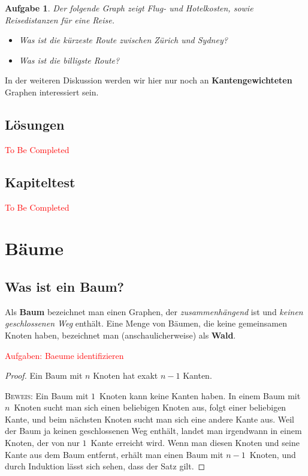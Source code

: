 \documentclass[12pt,a4paper]{report}
\theoremstyle{break}
\newtheorem{exercise}{Aufgabe}[section]
\theoremstyle{plain}
\newtheorem{proof}{Satz}[section]
\begin{document}
\begin{exercise}
\label{travel}
Der folgende Graph zeigt Flug- und Hotelkosten, sowie Reisedistanzen
f\"{u}r eine Reise.


\begin{itemize}
\item Was ist die \emph{k\"{u}rzeste} Route zwischen Z\"{u}rich und
    Sydney?
\item Was ist die \emph{billigste} Route?
\end{itemize}
\end{exercise}

 In der weiteren Diskussion werden wir hier nur noch an \textbf{Kantengewichteten} Graphen interessiert sein.

\section{L\"{o}sungen}

\textcolor{red}{To Be Completed}

\section{Kapiteltest}

\textcolor{red}{To Be Completed}

\chapter{B\"{a}ume}

\section{Was ist ein Baum?}

Als \textbf{Baum} bezeichnet man einen Graphen, der
\emph{zusammenh\"{a}ngend} ist und \emph{keinen geschlossenen Weg}
enth\"{a}lt. Eine Menge von B\"{a}umen, die keine gemeinsamen Knoten
haben, bezeichnet man (anschaulicherweise) als \textbf{Wald}.

\textcolor{red}{Aufgaben: Baeume identifizieren}

\begin{proof}
Ein Baum mit $n$ Knoten hat exakt $n-1$ Kanten.

\bigskip\noindent\textsc{Beweis:} Ein Baum mit $1$~Knoten kann keine Kanten haben.
In einem Baum mit $n$~Knoten sucht man sich einen beliebigen Knoten
aus, folgt einer beliebigen Kante, und beim n\"{a}chsten Knoten sucht
man sich eine andere Kante aus.
Weil der Baum ja keinen geschlossenen
Weg enth\"{a}lt, landet man irgendwann in einem Knoten, der von nur
$1$~Kante erreicht wird. 
Wenn man diesen Knoten und seine Kante aus
dem Baum entfernt, erh\"{a}lt man einen Baum mit $n-1$~Knoten, und
durch Induktion l\"{a}sst sich sehen, dass der Satz gilt.
\end{proof}
\end{document}
